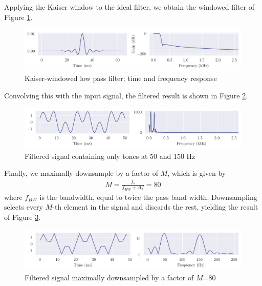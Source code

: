 \newpage

Applying the Kaiser window to the ideal filter, we obtain the windowed filter of Figure \ref{fig:q1_filter}.

\begin{figure}[ht]
    \centering
    \includegraphics[width=\textwidth]{images/q1_filter.png}
    \caption{Kaiser-windowed low pass filter; time and frequency response}
    \label{fig:q1_filter}
\end{figure}

Convolving this with the input signal, the filtered result is shown in Figure \ref{fig:q1_filtered}.

\begin{figure}[ht]
    \centering
    \includegraphics[width=\textwidth]{images/q1_filtered.png}
    \caption{Filtered signal containing only tones at 50 and 150 Hz}
    \label{fig:q1_filtered}
\end{figure}

Finally, we maximally downsample by a factor of $M$, which is given by
\begin{align}
    M = \frac{f_s}{f_{BW} + \Delta f} = 80
\end{align}
where $f_{BW}$ is the bandwidth, equal to twice the pass band width. Downsampling selects every $M$-th element in the signal and discards the rest, yielding the result of Figure \ref{fig:q1_dsamp}.

\begin{figure}[ht]
    \centering
    \includegraphics[width=\textwidth]{images/q1_dsamp.png}
    \caption{Filtered signal maximally downsampled by a factor of $M$=80}
    \label{fig:q1_dsamp}
\end{figure}

